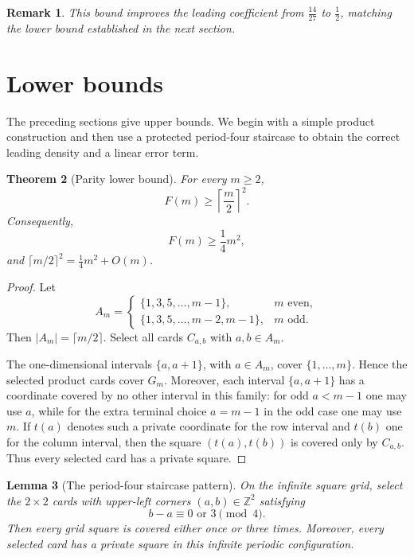 \documentclass[11pt]{article}
\newtheorem{theorem}{Theorem}[section]
\newtheorem{lemma}[theorem]{Lemma}
\newtheorem{remark}[theorem]{Remark}
\begin{document}
	
	\begin{remark}
		This bound improves the leading coefficient from \(\frac{14}{27}\)
		to \(\frac12\), matching the lower bound established in the next
		section.
	\end{remark}
	\section{Lower bounds}
	
	The preceding sections give upper bounds.  We begin with a simple product
	construction and then use a protected period-four staircase to obtain the
	correct leading density and a linear error term.
	
	\begin{theorem}[Parity lower bound]
		For every \(m\ge2\),
		\[
		F(m)\ge \left\lceil\frac m2\right\rceil^2.
		\]
		Consequently,
		\[
		F(m)\ge \frac14m^2,
		\]
		and \(\lceil m/2\rceil^2=\frac14m^2+O(m)\).
	\end{theorem}
	
	\begin{proof}
		Let
		\[
		A_m=
		\begin{cases}
			\{1,3,5,\ldots,m-1\}, & m \text{ even},\\
			\{1,3,5,\ldots,m-2,m-1\}, & m \text{ odd}.
		\end{cases}
		\]
		Then \(|A_m|=\lceil m/2\rceil\).  Select all cards \(C_{a,b}\) with
		\(a,b\in A_m\).
		
		The one-dimensional intervals \(\{a,a+1\}\), with \(a\in A_m\), cover
		\(\{1,\ldots,m\}\).  Hence the selected product cards cover \(G_m\).  Moreover,
		each interval \(\{a,a+1\}\) has a coordinate covered by no other interval in
		this family: for odd \(a<m-1\) one may use \(a\), while for the extra terminal
		choice \(a=m-1\) in the odd case one may use \(m\).  If \(t(a)\) denotes such a
		private coordinate for the row interval and \(t(b)\) one for the column
		interval, then the square \((t(a),t(b))\) is covered only by \(C_{a,b}\).  Thus
		every selected card has a private square.
	\end{proof}
	
	\begin{lemma}[The period-four staircase pattern]
		\label{lem:infinite-staircase}
		On the infinite square grid, select the \(2\times2\) cards with upper-left
		corners \((a,b)\in\mathbb Z^2\) satisfying
		\[
		b-a\equiv0 \text{ or }3\pmod4.
		\]
		Then every grid square is covered either once or three times.  Moreover, every
		selected card has a private square in this infinite periodic configuration.
	\end{lemma}
	
\end{document}
